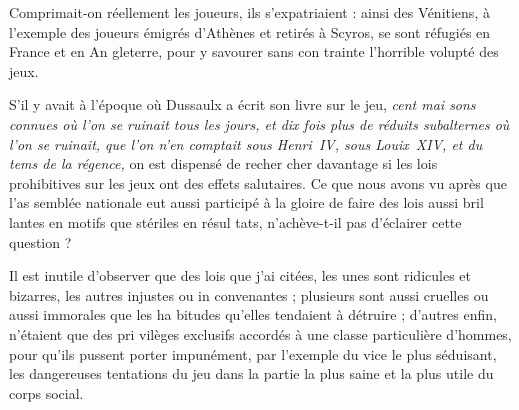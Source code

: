 Comprimait-on réellement les
joueurs, ils s'expatriaient : ainsi des
Vénitiens, à l'exemple des joueurs
émigrés d'Athènes et retirés à Scyros,
se sont réfugiés en France et en An%
gleterre, pour y savourer sans con%
trainte l'horrible volupté des jeux.

S'il y avait à l'époque où Dussaulx
a écrit son livre sur le jeu, \emph{cent mai%
  sons connues où l'on se ruinait tous
  les jours, et dix fois plus de réduits
  subalternes où l'on se ruinait, que
  l'on n'en comptait sous Henri~IV,
  sous Louix~XIV, et du tems de la
régence,} on est dispensé de recher%
cher davantage si les lois prohibitives
sur les jeux ont des effets salutaires.
Ce que nous avons vu après que l'as%
semblée nationale eut aussi participé
à la gloire de faire des lois aussi bril%
lantes en motifs que stériles en résul%
tats, n'achève-t-il pas d'éclairer cette
question ?

Il est inutile d'observer que des lois
que j'ai citées, les unes sont ridicules
et bizarres, les autres injustes ou in%
convenantes ; plusieurs sont aussi
cruelles ou aussi immorales que les ha%
bitudes qu'elles tendaient à détruire ;
d'autres enfin, n'étaient que des pri%
vilèges exclusifs accordés à une classe
particulière d'hommes, pour qu'ils
pussent porter impunément, par
l'exemple du vice le plus séduisant, les
dangereuses tentations du jeu dans la
partie la plus saine et la plus utile du
corps social.
